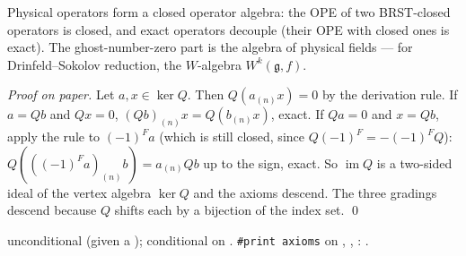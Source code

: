 \begin{physics}
Physical operators form a closed operator algebra: the OPE of two BRST-closed operators is closed, and
exact operators decouple (their OPE with closed ones is exact). The ghost-number-zero part is the
algebra of physical fields --- for Drinfeld--Sokolov reduction, the $W$-algebra $W^k(\mathfrak g,f)$.
\end{physics}
\emph{Proof on paper.} Let $a,x\in\ker Q$. Then $Q(a_{(n)}x) = 0$ by the derivation rule. If $a = Qb$
and $Qx = 0$, $(Qb)_{(n)}x = Q(b_{(n)}x)$, exact. If $Qa = 0$ and $x = Qb$, apply the rule to $(-1)^Fa$
(which is still closed, since $Q(-1)^F = -(-1)^FQ$): $Q(((-1)^Fa)_{(n)}b) = a_{(n)}Qb$ up to the sign,
exact. So $\operatorname{im}Q$ is a two-sided ideal of the vertex algebra $\ker Q$ and the axioms
descend. The three gradings descend because $Q$ shifts each by a bijection of the index set. \qed
\begin{status}
 unconditional (given a );  conditional on
. \texttt{\#print axioms} on , ,
: .
\end{status}

